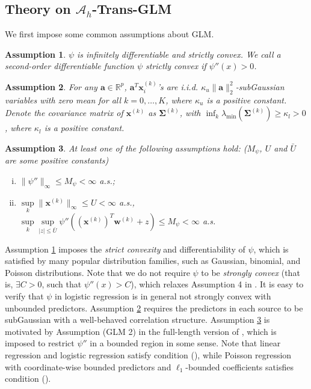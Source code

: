 \documentclass[12pt]{article}
\newcommand*{\rom}[1]{\romannumeral #1}
\newcommand{\infnorm}[1]{\|#1\|_{\infty}}
\newcommand{\twonorm}[1]{\|#1\|_{2}}
\newcommand{\bxk}[1]{\bm{x}^{(#1)}}
\newcommand{\bwk}[1]{\bm{w}^{(#1)}}
\newcommand{\mah}{\mathcal{A}_h}
\newcommand{\<}{\langle}
\renewcommand{\>}{\rangle}
\newtheorem{assumption}{Assumption}
\begin{document}
\subsection{Theory on $\mah$-Trans-GLM}\label{subsec:oracle alg}
We first impose some common assumptions about GLM. 

\begin{assumption}\label{asmp: convexity}
	$\psi$ is infinitely differentiable and strictly convex. We call a second-order differentiable function $\psi$ strictly convex if $\psi''(x) > 0$.
\end{assumption}

\begin{assumption}\label{asmp: x}
	For any $\bm{a} \in \mathbb{R}^p$, $\bm{a}^T\bxk{k}_i$'s are i.i.d. $\kappa_u\twonorm{\bm{a}}^2$-subGaussian variables with zero mean for all $k = 0, \ldots, K$, where $\kappa_u$ is a positive constant. Denote the covariance matrix of $\bxk{k}$ as $\bm{\Sigma}^{(k)}$, with $\inf_{k}\lambda_{\min}(\bm{\Sigma}^{(k)}) \geq \kappa_l > 0$, where $\kappa_l$ is a positive constant.
\end{assumption}

\begin{assumption}\label{asmp: second derivative}
	At least one of the following assumptions hold: ($M_{\psi}$, $U$ and $\bar{U}$ are some positive constants)
	\begin{enumerate}[(i)]
		\item $\infnorm{\psi''} \leq M_{\psi} < \infty$ a.s.;
		\item $\sup\limits_k \infnorm{\bxk{k}} \leq U < \infty$ a.s., $\sup\limits_{k}\sup\limits_{|z|\leq \bar{U}} \psi''((\bxk{k})^T\bwk{k} + z) \leq M_{\psi}< \infty$ a.s.
	\end{enumerate}
\end{assumption}

Assumption \ref{asmp: convexity} imposes the \textit{strict convexity} and differentiability of $\psi$, which is satisfied by many popular distribution families, such as Gaussian, binomial, and Poisson distributions. Note that we do not require $\psi$ to be \textit{strongly convex} (that is, $\exists C > 0$, such that $\psi''(x) > C$), which relaxes Assumption 4 in \cite{bastani2021predicting}. It is easy to verify that $\psi$ in logistic regression is in general not strongly convex with unbounded predictors. Assumption \ref{asmp: x} requires the predictors in each source to be subGaussian with a well-behaved correlation structure. Assumption \ref{asmp: second derivative} is motivated by Assumption (GLM 2) in the full-length version of \cite{negahban2009unified}, which is imposed to restrict $\psi''$ in a bounded region in some sense. Note that linear regression and logistic regression satisfy condition (\rom{1}), while Poisson regression with coordinate-wise bounded predictors and $\ell_1$-bounded coefficients satisfies condition (\rom{2}). 
\end{document}

